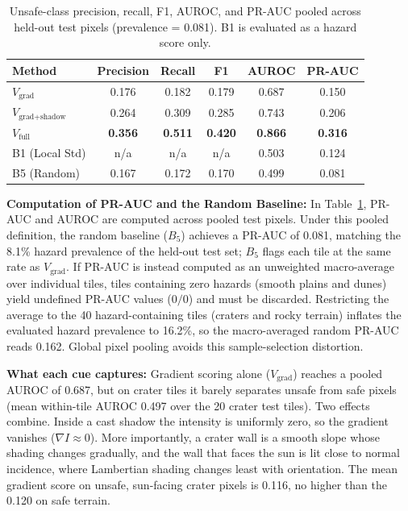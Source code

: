 \documentclass{article}
\begin{document}
\begin{table}[!htb]
  \caption{Unsafe-class precision, recall, F1, AUROC, and PR-AUC pooled across held-out test pixels (prevalence = 0.081). B1 is evaluated as a hazard score only.}
  \label{tab:classification}
  \centering
  \small
  \setlength{\tabcolsep}{6pt}
  \begin{tabular}{lccccc}
    \toprule
    Method & Precision & Recall & F1 & AUROC & PR-AUC \\
    \midrule
    $V_{\text{grad}}$ & 0.176 & 0.182 & 0.179 & 0.687 & 0.150 \\
    $V_{\text{grad+shadow}}$ & 0.264 & 0.309 & 0.285 & 0.743 & 0.206 \\
    $V_{\text{full}}$ & \textbf{0.356} & \textbf{0.511} & \textbf{0.420} & \textbf{0.866} & \textbf{0.316} \\
    B1 (Local Std) & n/a & n/a & n/a & 0.503 & 0.124 \\
    B5 (Random) & 0.167 & 0.172 & 0.170 & 0.499 & 0.081 \\
    \bottomrule
  \end{tabular}
\end{table}

\textbf{Computation of PR-AUC and the Random Baseline:} In Table~\ref{tab:classification}, PR-AUC and AUROC are computed across pooled test pixels. Under this pooled definition, the random baseline ($B_5$) achieves a PR-AUC of 0.081, matching the 8.1\% hazard prevalence of the held-out test set; $B_5$ flags each tile at the same rate as $V_{\text{grad}}$. If PR-AUC is instead computed as an unweighted macro-average over individual tiles, tiles containing zero hazards (smooth plains and dunes) yield undefined PR-AUC values ($0/0$) and must be discarded. Restricting the average to the 40 hazard-containing tiles (craters and rocky terrain) inflates the evaluated hazard prevalence to 16.2\%, so the macro-averaged random PR-AUC reads 0.162. Global pixel pooling avoids this sample-selection distortion.

\textbf{What each cue captures:} Gradient scoring alone ($V_{\text{grad}}$) reaches a pooled AUROC of 0.687, but on crater tiles it barely separates unsafe from safe pixels (mean within-tile AUROC 0.497 over the 20 crater test tiles). Two effects combine. Inside a cast shadow the intensity is uniformly zero, so the gradient vanishes ($\nabla I \approx 0$). More importantly, a crater wall is a smooth slope whose shading changes gradually, and the wall that faces the sun is lit close to normal incidence, where Lambertian shading changes least with orientation. The mean gradient score on unsafe, sun-facing crater pixels is 0.116, no higher than the 0.120 on safe terrain.
\end{document}
